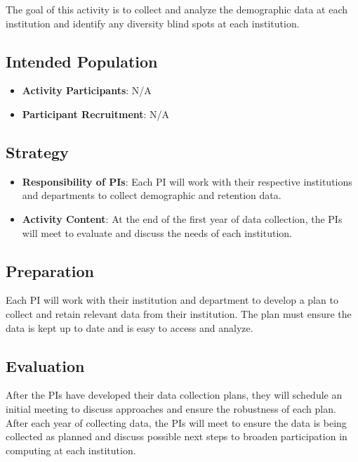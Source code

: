 \documentclass[11pt]{article}
\begin{document}
    The goal of this activity is to collect and analyze the demographic data at each institution and identify any diversity blind spots at each institution.

    \subsection{Intended Population}
    \begin{itemize}
    	\item 
	    \textbf{Activity Participants}: N/A

	    \item 
	    \textbf{Participant Recruitment}: N/A
    \end{itemize}

    \subsection{Strategy}

    \begin{itemize}
    	\item 
	    \textbf{Responsibility of PIs}: Each PI will work with their respective institutions and departments to collect demographic and retention data.

	    \item 
	    \textbf{Activity Content}: At the end of the first year of data collection, the PIs will meet to evaluate and discuss the needs of each institution.
    \end{itemize}

    \subsection{Preparation}
    Each PI will work with their institution and department to develop a plan to collect and retain relevant data from their institution.
    The plan must ensure the data is kept up to date and is easy to access and analyze.

    \subsection{Evaluation}
    After the PIs have developed their data collection plans, they will schedule an initial meeting to discuss approaches and ensure the robustness of each plan.
    After each year of collecting data, the PIs will meet to ensure the data is being collected as planned and discuss possible next steps to broaden participation in computing at each institution.
\end{document}
